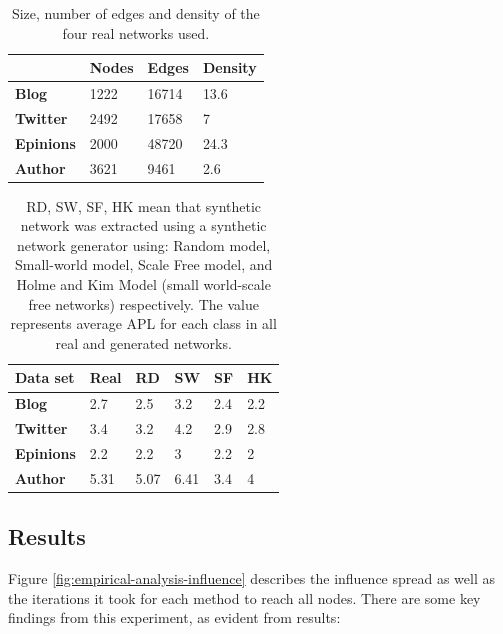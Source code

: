 		\begin{table}[h]
			\centering
			\begin{tabular}{|l|l|l|l|}
				\hline
				& \textbf{Nodes} & \textbf{Edges} & \textbf{Density} \\ \hline
				\textbf{Blog}     & 1222           & 16714          & 13.6             \\ \hline
				\textbf{Twitter}  & 2492           & 17658          & 7                \\ \hline
				\textbf{Epinions} & 2000           & 48720          & 24.3             \\ \hline
				\textbf{Author}   & 3621           & 9461           & 2.6              \\ \hline
			\end{tabular}
			\caption{Size, number of edges and density of the four real networks used.}
			\label{tab:inf-max-social-networks-2}
		\end{table}
		
		\begin{table}[h]
			\centering
			\begin{tabular}{|l|l|l|l|l|l|}
				\hline
				\textbf{Data set} & \textbf{Real} & \textbf{RD} & \textbf{SW} & \textbf{SF} & \textbf{HK} \\ \hline
				\textbf{Blog}     & 2.7           & 2.5         & 3.2         & 2.4         & 2.2         \\ \hline
				\textbf{Twitter}  & 3.4           & 3.2         & 4.2         & 2.9         & 2.8         \\ \hline
				\textbf{Epinions} & 2.2           & 2.2         & 3           & 2.2         & 2           \\ \hline
				\textbf{Author}   & 5.31          & 5.07        & 6.41        & 3.4         & 4           \\ \hline
			\end{tabular}
			\caption{RD, SW, SF, HK mean that synthetic network was extracted using a synthetic network generator using: Random model, Small-world model, Scale Free model, and Holme and Kim Model (small world-scale free networks) respectively. The value represents average APL for each class in all real and generated networks.}
			\label{tab:inf-max-empirical-analysis-apl}
		\end{table}
		
		\subsection{Results}
		Figure \ref{fig:empirical-analysis-influence} describes the influence spread as well as the iterations it took for each method to reach all nodes. There are some key findings from this experiment, as evident from results:
		
